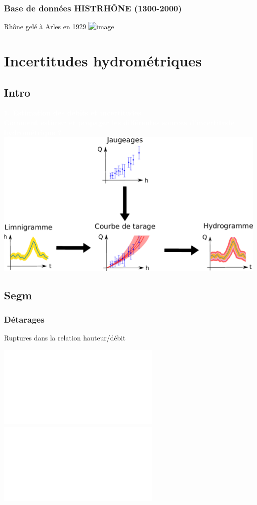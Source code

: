 \documentclass[compress,9pt]{beamer}
\begin{document}
	\begin{frame}%
		\frametitle{Base de données HISTRHÔNE (1300-2000)}
		\vfill		
		\centering
		Rhône gelé à Arles en 1929
		\vfill
		\includegraphics<1>[width = .7\textwidth]{./Figures/RhoneGele.jpg}
	\end{frame}	

\section{Incertitudes hydrométriques} 
	\subsection{Intro}
{
    \begin{frame}
        \begin{center}
        	\vfill
		 	\textcolor{white}{\large \textbf{1. Estimation des débits et incertitudes}}\\
		 	\vspace{0.5cm}
		 	\textcolor{white}{\large \textbf{Comment estimer et propager les différentes sources d'incertitude hydrométrique ?}}\\
			\vfill
			\includegraphics[width = .6\textwidth]{./Figures/Hydrom4.pdf}
        \end{center}
    \end{frame}
    }
    
  
    \subsection{Segm}
	\begin{frame}%
		\frametitle{Détarages}
		\centering
		Ruptures dans la relation hauteur/débit\\
		\vfill
		\begin{center}
			\includegraphics<1>[width = .45\textwidth]{./Figures/Detar1.pdf} 
			\includegraphics<2>[width = .45\textwidth]{./Figures/Detar2.pdf} 
		\end{center}
	\end{frame}
	
\end{document}
